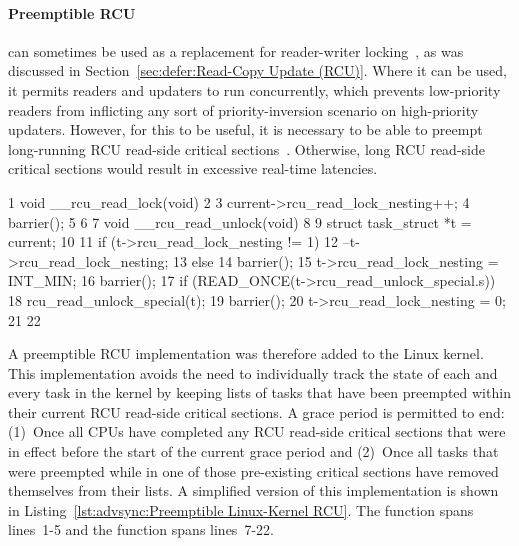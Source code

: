 \paragraph{Preemptible RCU}
can sometimes be used as a replacement for reader-writer
locking~\cite{PaulEMcKenney2007WhatIsRCUFundamentally,PaulMcKenney2012RCUUsage,PaulEMcKenney2014RCUAPI},
as was discussed in Section~\ref{sec:defer:Read-Copy Update (RCU)}.
Where it can be used, it permits readers and updaters to run concurrently,
which prevents low-priority readers from inflicting any sort of
priority-inversion scenario on high-priority updaters.
However, for this to be useful, it is necessary to be able to preempt
long-running RCU read-side critical
sections~\cite{DinakarGuniguntala2008IBMSysJ}.
Otherwise, long RCU read-side critical sections would result in
excessive real-time latencies.

\begin{listing}[tb]
{ \scriptsize
\begin{verbbox}
 1 void __rcu_read_lock(void)
 2 {
 3   current->rcu_read_lock_nesting++;
 4   barrier();
 5 }
 6 
 7 void __rcu_read_unlock(void)
 8 {
 9   struct task_struct *t = current;
10 
11   if (t->rcu_read_lock_nesting != 1) {
12     --t->rcu_read_lock_nesting;
13   } else {
14     barrier();
15     t->rcu_read_lock_nesting = INT_MIN;
16     barrier();
17     if (READ_ONCE(t->rcu_read_unlock_special.s))
18       rcu_read_unlock_special(t);
19     barrier();
20     t->rcu_read_lock_nesting = 0;
21   }
22 }
\end{verbbox}
}
\centering
\theverbbox
\caption{Preemptible Linux-Kernel RCU}
\label{lst:advsync:Preemptible Linux-Kernel RCU}
\end{listing}

A preemptible RCU implementation was therefore added to the Linux kernel.
This implementation avoids the need to individually track the state of
each and every task in the kernel by keeping lists of tasks that have
been preempted within their current RCU read-side critical sections.
A grace period is permitted to end: (1)~Once all CPUs have completed any
RCU read-side critical sections that were in effect before the start
of the current grace period and
(2)~Once all tasks that were preempted
while in one of those pre-existing critical sections have removed
themselves from their lists.
A simplified version of this implementation is shown in
Listing~\ref{lst:advsync:Preemptible Linux-Kernel RCU}.
The  function spans lines~1-5 and
the  function spans lines~7-22.

